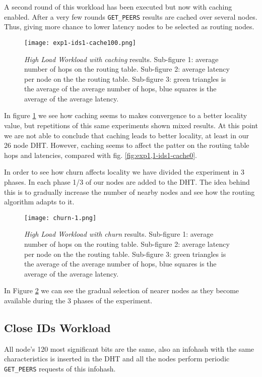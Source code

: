 \documentclass[conference]{IEEEtran}
\begin{document}
A second round of this workload has been executed but now with caching enabled. After a very few rounds \texttt{GET\_PEERS} results are cached over several nodes. Thus, giving more chance to lower latency nodes to be selected as routing nodes.

\begin{figure}
    \texttt{[image: exp1-ids1-cache100.png]}
    \caption{\textit{High Load Workload with caching} results. Sub-figure 1: average number of hops on the routing table. Sub-figure 2: average latency per node on the the routing table. Sub-figure 3: green triangles is the average of the average number of hops, blue squares is the average of the average latency.}
    \label{fig:exp1-ids1-cache100}
\end{figure}

In figure \ref{fig:exp1-ids1-cache100} we see how caching seems to makes convergence to a better locality value, but repetitions of this same experiments shown mixed results. At this point we are not able to conclude that caching leads to better locality, at least in our 26 node DHT. However, caching seems to affect the patter on the routing table hops and latencies, compared with fig. \ref{fig:exp1,1-ids1-cache0}.

In order to see how churn affects locality we have divided the experiment in 3 phases. In each phase 1/3 of our nodes are added to the DHT. The idea behind this is to gradually increase the number of nearby nodes and see how the routing algorithm adapts to it.

\begin{figure}
    \texttt{[image: churn-1.png]}
    \caption{\textit{High Load Workload with churn} results. Sub-figure 1: average number of hops on the routing table. Sub-figure 2: average latency per node on the the routing table. Sub-figure 3: green triangles is the average of the average number of hops, blue squares is the average of the average latency.}
    \label{fig:churn-1}
\end{figure}

In Figure \ref{fig:churn-1} we can see the gradual selection of nearer nodes as they become available during the 3 phases of the experiment.

\subsection{Close IDs Workload}

All node's 120 most significant bits are the same, also an infohash with the same characteristics is inserted in the DHT and all the nodes perform periodic \texttt{GET\_PEERS} requests of this infohash.
\end{document}
